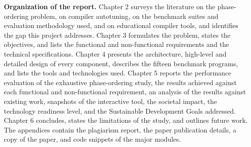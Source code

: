 \textbf{Organization of the report.} Chapter 2 surveys the literature on the phase-ordering problem, on compiler autotuning, on the benchmark suites and evaluation methodology used, and on educational compiler tools, and identifies the gap this project addresses. Chapter 3 formulates the problem, states the objectives, and lists the functional and non-functional requirements and the technical specifications. Chapter 4 presents the architecture, high-level and detailed design of every component, describes the fifteen benchmark programs, and lists the tools and technologies used. Chapter 5 reports the performance evaluation of the exhaustive phase-ordering study, the results achieved against each functional and non-functional requirement, an analysis of the results against existing work, snapshots of the interactive tool, the societal impact, the technology readiness level, and the Sustainable Development Goals addressed. Chapter 6 concludes, states the limitations of the study, and outlines future work. The appendices contain the plagiarism report, the paper publication details, a copy of the paper, and code snippets of the major modules.
